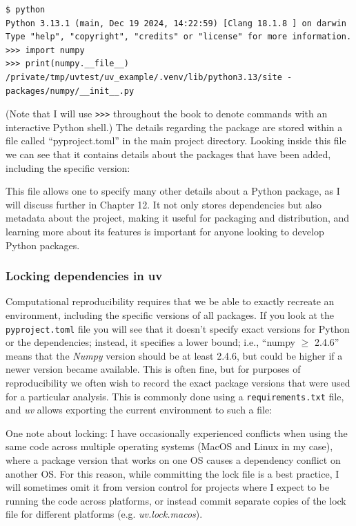 \begin{lstlisting}[style=shell]
$ python
Python 3.13.1 (main, Dec 19 2024, 14:22:59) [Clang 18.1.8 ] on darwin
Type "help", "copyright", "credits" or "license" for more information.
>>> import numpy
>>> print(numpy.__file__)
/private/tmp/uvtest/uv_example/.venv/lib/python3.13/site -packages/numpy/__init__.py
\end{lstlisting}

(Note that I will use \texttt{\textgreater \textgreater \textgreater } throughout the book to denote commands with an interactive Python shell.)
The details regarding the package are stored within a file called ``pyproject.toml'' in the main project directory.
Looking inside this file we can see that it contains details about the packages that have been added, including the specific version:




This file allows one to specify many other details about a Python package, as I will discuss further in Chapter 12.
It not only stores dependencies but also metadata about the project, making it useful for packaging and distribution, and learning more about its features is important for anyone looking to develop Python packages.

\subsubsection{Locking dependencies in uv}

Computational reproducibility requires that we be able to exactly recreate an environment, including the specific versions of all packages.
If you look at the \texttt{pyproject.toml} file you will see that it doesn't specify exact versions for Python or the dependencies; instead, it specifies a lower bound; i.e., ``numpy $\geq$ 2.4.6'' means that the \textit{Numpy} version should be at least 2.4.6, but could be higher if a newer version became available.
This is often fine, but for purposes of reproducibility we often wish to record the exact package versions that were used for a particular analysis.
This is commonly done using a \texttt{requirements.txt} file, and \textit{uv} allows exporting the current environment to such a file:



One note about locking: I have occasionally experienced conflicts when using the same code across multiple operating systems (MacOS and Linux in my case), where a package version that works on one OS causes a dependency conflict on another OS.  For this reason, while committing the lock file is a best practice, I will sometimes omit it from version control for projects where I expect to be running the code across platforms, or instead commit separate copies of the lock file for different platforms (e.g. \textit{uv.lock.macos}).

